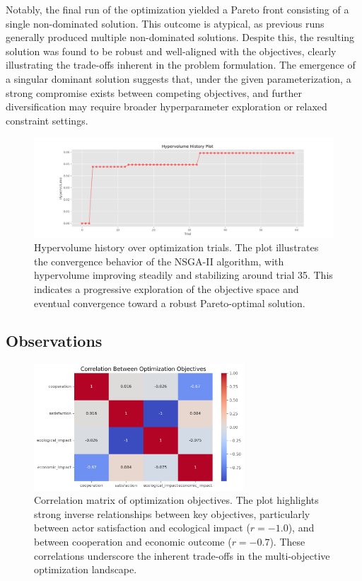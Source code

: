 \documentclass[ruler]{CUP-JNL-EDS}%
\begin{document}
Notably, the final run of the optimization yielded a Pareto front consisting of a single non-dominated solution. This outcome is atypical, as previous runs generally produced multiple non-dominated solutions. Despite this, the resulting solution was found to be robust and well-aligned with the objectives, clearly illustrating the trade-offs inherent in the problem formulation. The emergence of a singular dominant solution suggests that, under the given parameterization, a strong compromise exists between competing objectives, and further diversification may require broader hyperparameter exploration or relaxed constraint settings.
\begin{figure}[h]
    \centering
    \includegraphics[width=1.0\textwidth]{./assets/images/hypervolume.png}
    \caption{Hypervolume history over optimization trials. The plot illustrates the convergence behavior of the NSGA-II algorithm, with hypervolume improving steadily and stabilizing around trial 35. This indicates a progressive exploration of the objective space and eventual convergence toward a robust Pareto-optimal solution.}
    \label{fig:hypervolume_history}
\end{figure}

\subsection{Observations}
\begin{figure}
    \centering
    \includegraphics[width=0.7\textwidth]{./assets/images/objectives_correlation.png}
    \caption{Correlation matrix of optimization objectives. The plot highlights strong inverse relationships between key objectives, particularly between actor satisfaction and ecological impact ($r = -1.0$), and between cooperation and economic outcome ($r = -0.7$). These correlations underscore the inherent trade-offs in the multi-objective optimization landscape.}
    \label{fig:objectives_correlation}
\end{figure}
\end{document}
